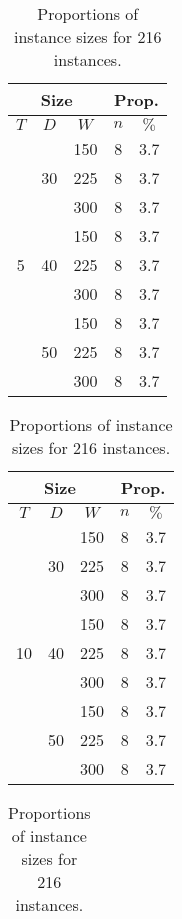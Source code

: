 \documentclass[../../thesis.tex]{subfiles}
\begin{document}
\begin{table}[H]
  \caption{Proportions of instance sizes for 216 instances.}
  \label{instances:proportions}
  \centering
  \begin{tabular}[t]{|c|c|c |c|c|}
    \hline
    \multicolumn{3}{|c|}{Size} & \multicolumn{2}{|c|}{Prop.} \\
    \hline 
    $T$ & $D$ & $W$ & $n$ & $\%$ \\
    \hline 
    \multirow{9}{*}{5} & \multirow{3}{*}{30} & 150 & 8 & 3.7 \\ 
    \cline{3-5}
     &  & 225 & 8 & 3.7 \\ 
     \cline{3-5}
     &  & 300 & 8 & 3.7 \\ 
     \cline{2-5}
     & \multirow{3}{*}{40} & 150 & 8 & 3.7 \\ 
     \cline{3-5}
     &  & 225 & 8 & 3.7 \\ 
     \cline{3-5}
     &  & 300 & 8 & 3.7 \\ 
     \cline{2-5}
     & \multirow{3}{*}{50} & 150 & 8 & 3.7 \\ 
     \cline{3-5}
     &  & 225 & 8 & 3.7 \\ 
     \cline{3-5}
     &  & 300 & 8 & 3.7 \\ 
    \hline
  \end{tabular}
  \hfill
  \begin{tabular}[t]{|c|c|c |c|c|}
    \hline
    \multicolumn{3}{|c|}{Size} & \multicolumn{2}{|c|}{Prop.} \\
    \hline 
    $T$ & $D$ & $W$ & $n$ & $\%$ \\
    \hline 
    \multirow{9}{*}{10} & \multirow{3}{*}{30} & 150 & 8 & 3.7 \\ 
    \cline{3-5}
     &  & 225 & 8 & 3.7 \\ 
     \cline{3-5}
     &  & 300 & 8 & 3.7 \\ 
     \cline{2-5}
     & \multirow{3}{*}{40} & 150 & 8 & 3.7 \\ 
     \cline{3-5}
     &  & 225 & 8 & 3.7 \\ 
     \cline{3-5}
     &  & 300 & 8 & 3.7 \\ 
     \cline{2-5}
     & \multirow{3}{*}{50} & 150 & 8 & 3.7 \\ 
     \cline{3-5}
     &  & 225 & 8 & 3.7 \\ 
     \cline{3-5}
     &  & 300 & 8 & 3.7 \\ 
    \hline
  \end{tabular}
  \hfill
  \begin{tabular}[t]{|c|c|c |c|c|}

\end{tabular}
\end{table}
\end{document}
